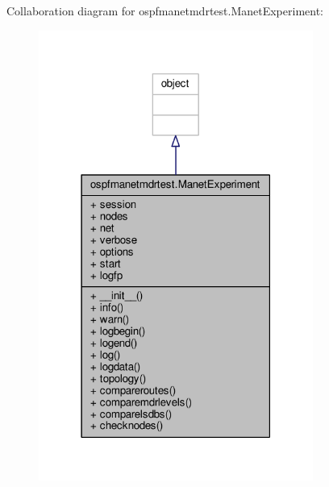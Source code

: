 Collaboration diagram for ospfmanetmdrtest.\+Manet\+Experiment\+:
\nopagebreak
\begin{figure}[H]
\begin{center}
\leavevmode
\includegraphics[width=255pt]{classospfmanetmdrtest_1_1_manet_experiment__coll__graph}
\end{center}
\end{figure}
